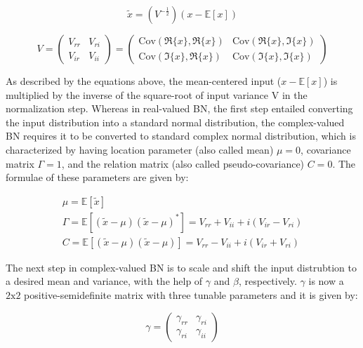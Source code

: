  \begin{equation}
\tilde{x} = (V^{-\frac{1}{2}})(x - \mathbb{E}[x])
\label{eqcbn1}
\end{equation}

 \begin{equation}
V = \begin{pmatrix} V_{rr} & V_{ri}\\ V_{ir} & V_{ii} \end{pmatrix} = 
\begin{pmatrix} \mathrm{Cov}(\Re{\{x\}},\Re{\{x\}}) & \mathrm{Cov}(\Re{\{x\}},\Im{\{x\}})\\  \mathrm{Cov}(\Im{\{x\}},\Re{\{x\}}) & \mathrm{Cov}(\Im{\{x\}},\Im{\{x\}}) \end{pmatrix}
\label{eqcbn2}
\end{equation}

As described by the equations above, the mean-centered input ($x - \mathbb{E}[x]$) is multiplied by the inverse of the square-root of input variance $\mathrm{V}$ in the normalization step.%
Whereas in real-valued BN, the first step entailed converting the input distribution into a standard normal distribution, the complex-valued BN requires it to be converted to standard complex normal distribution, which is characterized by having location parameter (also called mean) $\mu = 0$, covariance matrix $\Gamma = 1$, and the relation matrix (also called pseudo-covariance) $C = 0$. The formulae of these parameters are given by:

\begin{equation}
\label{eqcbn3}
\begin{aligned}
&\mu = \mathbb{E}[\tilde{x}]&\\
&\Gamma = \mathbb{E}[(\tilde{x}-\mu)(\tilde{x}-\mu)^{*}] = V_{rr} + V_{ii} + i (V_{ir} - V_{ri} )&\\
&C = \mathbb{E}[(\tilde{x}-\mu)(\tilde{x}-\mu)] = V_{rr} - V_{ii} + i (V_{ir} + V_{ri} )&
\end{aligned}
\end{equation}

The next step in complex-valued BN is to scale and shift the input distrubtion to a desired mean and variance, with the help of $\gamma$ and $\beta$, respectively. $\gamma$ is now a $\mathrm{2} \mathrm{x} \mathrm{2}$ positive-semidefinite matrix with three tunable parameters and it is given by:

\begin{equation}
\gamma = \begin{pmatrix} \gamma_{rr} & \gamma_{ri}\\ \gamma_{ri} & \gamma_{ii} \end{pmatrix} 
\label{eqcbn4}
\end{equation}

